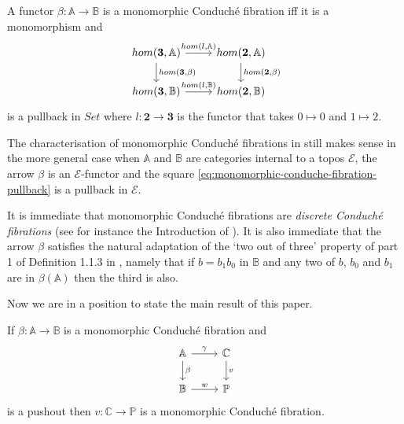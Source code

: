 \documentclass{article}
\begin{document}
\begin{lemma}\label{characterisation-of-monomorphic-discrete-conduche-fibrations}
	A functor $\beta:\mathbb{A}\rightarrow \mathbb{B}$ is a monomorphic Conduch\'{e} fibration iff it is a monomorphism and
	\begin{equation}\label{eq:monomorphic-conduche-fibration-pullback}
		\begin{tikzcd}
			hom(\mathbf{3},\mathbb{A}) \rar{hom(l,\mathbb{A})} \dar{hom(\mathbf{3},\beta)} & hom(\mathbf{2},\mathbb{A}) \dar{hom(\mathbf{2},\beta)} \\
			hom(\mathbf{3},\mathbb{B}) \rar{hom(l,\mathbb{B})} & hom(\mathbf{2},\mathbb{B})
		\end{tikzcd}
	\end{equation}
	is a pullback in $Set$ where $l:\mathbf{2}\rightarrow \mathbf{3}$ is the functor that takes $0 \mapsto 0$ and $1 \mapsto 2$.
\end{lemma}

\begin{remark}
	The characterisation of monomorphic Conduch\'{e} fibrations in  still makes sense in the more general case when $\mathbb{A}$ and $\mathbb{B}$ are categories internal to a topos $\mathcal E$, the arrow $\beta$ is an $\mathcal E$-functor and the square \eqref{eq:monomorphic-conduche-fibration-pullback} is a pullback in $\mathcal E$.
\end{remark}

\begin{remark}
	It is immediate that monomorphic Conduch\'{e} fibrations are \emph{discrete Conduch\'{e} fibrations} (see for instance the Introduction of \cite{MR1667312}).
	It is also immediate that the arrow $\beta$ satisfies the natural adaptation of the `two out of three' property of part 1 of Definition 1.1.3 in \cite{MR1650134}, namely that if $b=b_1b_0$ in $\mathbb{B}$ and any two of $b$, $b_0$ and $b_1$ are in $\beta(\mathbb{A})$ then the third is also.
\end{remark}

Now we are in a position to state the main result of this paper.

\begin{theorem}
	If $\beta:\mathbb{A} \rightarrow \mathbb{B}$ is a monomorphic Conduch\'{e} fibration and
	\begin{equation}
		\begin{tikzcd}
			\mathbb{A} \rar{\gamma} \dar{\beta} & \mathbb{C} \dar{v} \\
			\mathbb{B} \rar{w} & \mathbb{P}
		\end{tikzcd}
	\end{equation}
	is a pushout then $v: \mathbb{C} \rightarrow \mathbb{P}$ is a monomorphic Conduch\'{e} fibration.
\end{theorem}
\end{document}
